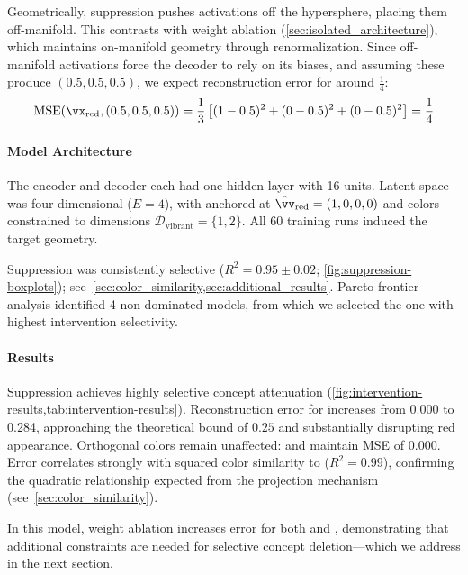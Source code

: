 Geometrically, suppression pushes activations off the hypersphere, placing them off-manifold. This contrasts with weight ablation (\cref{sec:isolated_architecture}), which maintains on-manifold geometry through renormalization. Since off-manifold activations force the decoder to rely on its biases, and assuming these produce  $(0.5, 0.5, 0.5)$, we expect reconstruction error for  around $\frac{1}{4}$:
\begin{equation}
    \text{MSE}(\vx_{\text{red}}, (0.5, 0.5, 0.5)) = \frac{1}{3}\left[(1-0.5)^2 + (0-0.5)^2 + (0-0.5)^2\right] = \frac{1}{4} \label{eq:mse_gray}
\end{equation}

\paragraph{Model Architecture}
The encoder and decoder each had one hidden layer with 16 units. Latent space was four-dimensional ($E = 4$), with  anchored at $\hat{\vv}_{\text{red}} = (1,0,0,0)$ and  colors constrained to dimensions $\mathcal{D}_{\text{vibrant}} = \{1,2\}$. All 60 training runs induced the target geometry.

Suppression was consistently selective ($R^2 = 0.95 \pm 0.02$; \cref{fig:suppression-boxplots}); see~\cref{sec:color_similarity,sec:additional_results}. Pareto frontier analysis identified 4 non-dominated models, from which we selected the one with highest intervention selectivity.

\paragraph{Results}
Suppression achieves highly selective concept attenuation (\cref{fig:intervention-results,tab:intervention-results}). Reconstruction error for  increases from 0.000 to 0.284, approaching the theoretical bound of $0.25$ and substantially disrupting red appearance. Orthogonal colors remain unaffected:  and  maintain MSE of 0.000. Error correlates strongly with squared color similarity to  ($R^2 = 0.99$), confirming the quadratic relationship expected from the projection mechanism (see~\cref{sec:color_similarity}).

In this model, weight ablation increases error for both  and , demonstrating that additional constraints are needed for selective concept deletion---which we address in the next section.

